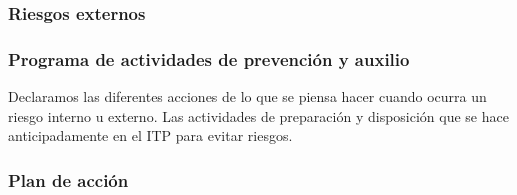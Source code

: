     \subsubsection{Riesgos externos}
    
    \subsubsection{Programa de actividades de prevención y auxilio}
    
    Declaramos las diferentes acciones de lo que se piensa hacer cuando ocurra un riesgo interno u externo. 
    Las actividades de preparación y disposición que se hace anticipadamente en el ITP para evitar riesgos.
    \subsubsection{Plan de acción}
    
